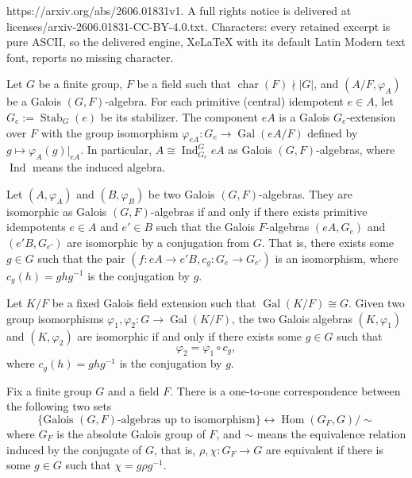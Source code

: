 \documentclass[10pt,a4paper]{amsart}
\begin{document}
https://arxiv.org/abs/2606.01831v1. A full rights notice is delivered at licenses/arxiv-2606.01831-CC-BY-4.0.txt. Characters: every retained excerpt is pure ASCII, so the delivered engine, XeLaTeX with its default Latin Modern text font, reports no missing character.
	\begin{theorem}\label{thm: structure of Galois algebras}
		Let $G$ be a finite group, $F$ be a field such that $\operatorname{char}(F)\nmid\lvert G\rvert$, and $(A/F,\varphi_A)$ be a Galois $(G,F)$-algebra.
		For each primitive (central) idempotent $e\in A$, let $G_e:=\operatorname{Stab}_G(e)$ be its stabilizer.
		The component $eA$ is a Galois $G_e$-extension over $F$ with the group isomorphism $\varphi_{eA}:G_e\to\operatorname{Gal}(eA/F)$ defined by $g\mapsto\varphi_A(g)\vert_{eA}$.
		In particular, $A\cong\operatorname{Ind}^G_{G_e} eA$ as Galois $(G,F)$-algebras, where $\operatorname{Ind}$ means the induced algebra.
	\end{theorem}

	\begin{proposition}\label{prop: isomorphisms of G-algebras}
		Let $(A,\varphi_A)$ and $(B,\varphi_B)$ be two Galois $(G,F)$-algebras.
		They are isomorphic as Galois $(G,F)$-algebras if and only if there exists primitive idempotents $e\in A$ and $e'\in B$ such that the Galois $F$-algebras $(eA,G_e)$ and $(e'B,G_{e'})$ are isomorphic by a conjugation from $G$.
		That is, there exists some $g\in G$ such that the pair $(f:eA\to e'B,c_g:G_e\to G_{e'})$ is an isomorphism, where $c_g(h)=ghg^{-1}$ is the conjugation by $g$.
	\end{proposition}

	\begin{corollary}\label{cor: Galois G-extensions}
		Let $K/F$ be a fixed Galois field extension such that $\operatorname{Gal}(K/F)\cong G$.
		Given two group isomorphisms $\varphi_1,\varphi_2:G\to\operatorname{Gal}(K/F)$, the two Galois algebras $(K,\varphi_1)$ and $(K,\varphi_2)$ are isomorphic if and only if there exists some $g\in G$ such that
		\begin{equation*}
			\varphi_2=\varphi_1\circ c_g,
		\end{equation*}
		where $c_g(h)=ghg^{-1}$ is the conjugation by $g$.
	\end{corollary}

	\begin{proposition}\label{prop: 1-1 correspondence for G-structured algebras}
		Fix a finite group $G$ and a field $F$.
		There is a one-to-one correspondence between the following two sets
		\begin{equation*}
			\{\text{Galois }(G,F)\text{-algebras up to isomorphism}\}\leftrightarrow\operatorname{Hom}(G_F,G)/\sim
		\end{equation*}
		where $G_F$ is the absolute Galois group of $F$, and $\sim$ means the equivalence relation induced by the conjugate of $G$, that is, $\rho,\chi:G_F\to G$ are equivalent if there is some $g\in G$ such that $\chi=g\rho g^{-1}$.
	\end{proposition}
\end{document}
